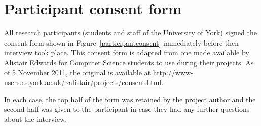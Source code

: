 \documentclass[draft]{scrartcl}
\begin{document}
\appendix


% 
% 
% 
% 

\clearpage
\section{Participant consent form}
\label{sec:consent}

All research participants (students and staff of the University of York)
signed the consent form shown in Figure~\ref{participantconsent} immediately
before their interview took place. This consent form is adapted from one made
available by Alistair Edwards for Computer Science students to use during
their projects. As of 5 November 2011, the original is available at
\url{http://www-users.cs.york.ac.uk/~alistair/projects/consent.html}.

In each case, the top half of the form was retained by the project author and
the second half was given to the participant in case they had any further
questions about the interview.
\end{document}

